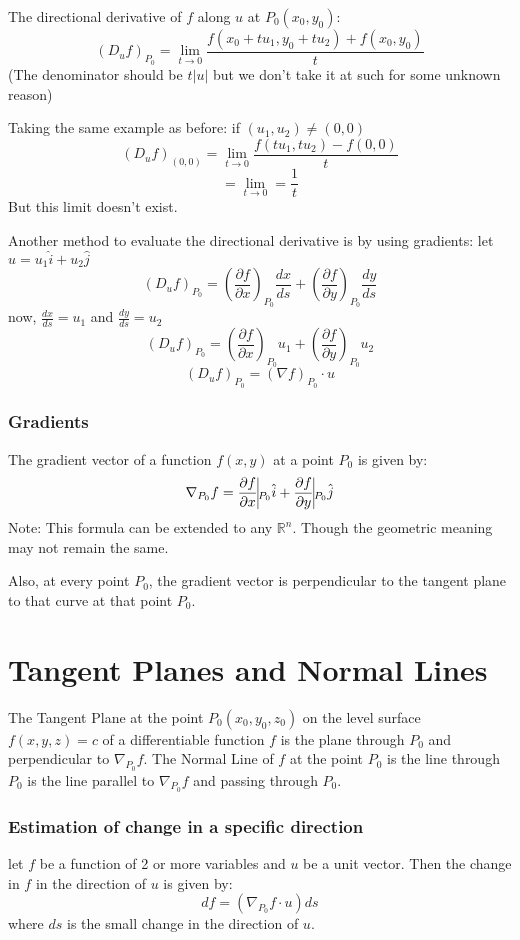 \documentclass{article}
\begin{document}
The directional derivative of $f$ along $u$ at $P_0(x_0, y_0)$:
\[ \left(D_u f\right)_{P_0} = \lim_{t \rightarrow 0} \frac{f\left(x_0 + tu_1, y_0 + tu_2\right) + f\left(x_0, y_0\right)}{t}\]
(The denominator should be $t|u|$ but we don't take it at such for some unknown reason)

Taking the same example as before:
if $(u_1, u_2) \neq (0,0)$
\[ \left(D_u f\right)_{(0,0)} = \lim_{t \rightarrow 0} \frac{f\left(tu_1, tu_2\right) - f(0,0)}{t}\]
\[ = \lim_{t \rightarrow 0} = \frac{1}{t}\]
But this limit doesn't exist.

Another method to evaluate the directional derivative is by using gradients:
let $u = u_1 \hat{i} + u_2 \hat{j}$
\[ \left( D_u f\right)_{P_0} = \left(\frac{\partial f}{\partial x}\right)_{P_0} \frac{dx}{ds} + \left( \frac{\partial f}{\partial y} \right)_{P_0} \frac{dy}{ds} \]
now, $\frac{dx}{ds} = u_1$ and $\frac{dy}{ds} = u_2$
\[ \left( D_u f\right)_{P_0} = \left(\frac{\partial f}{\partial x}\right)_{P_0} u_1 + \left(\frac{\partial f}{\partial y}\right)_{P_0} u_2 \]
\[ \left( D_u f\right)_{P_0} = (\nabla f)_{P_0} \cdot u \]

\subsubsection{Gradients}
The gradient vector of a function $f(x,y)$ at a point $P_0$ is given by:
\[ \nabla_{P_0} f = \frac{\partial f}{\partial x} \vline_{P_0} \hat{i} + \frac{\partial f}{\partial y} \vline_{P_0} \hat{j} \]
Note: This formula can be extended to any $\mathbb{R}^n$. Though the geometric meaning may not remain the same.

Also, at every point $P_0$, the gradient vector is perpendicular to the tangent plane to that curve at that point $P_0$.

\section{Tangent Planes and Normal Lines}
The Tangent Plane at the point $P_0(x_0, y_0, z_0)$ on the level surface $f(x,y,z) = c$ of a differentiable function $f$ is the plane through $P_0$ and perpendicular to $\nabla_{P_0} f$.
The Normal Line of $f$ at the point $P_0$ is the line through $P_0$ is the line parallel to $\nabla_{P_0} f$ and passing through $P_0$.

\subsubsection{Estimation of change in a specific direction}
let $f$ be a function of 2 or more variables and $u$ be a unit vector. Then the change in $f$ in the direction of $u$ is given by:
\[ df = \left( \nabla_{P_0} f \cdot u \right) ds \]
where $ds$ is the small change in the direction of $u$.
\end{document}
